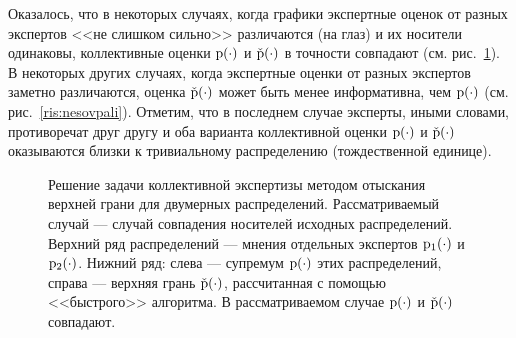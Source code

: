 Оказалось, что в некоторых случаях, когда графики экспертные оценок от разных экспертов <<не слишком сильно>> различаются (на глаз) и их носители одинаковы, коллективные оценки ${\mathrm{p}}(\cdot)$ и $\check{{\mathrm{p}}}(\cdot)$ в точности совпадают (см. рис.~\ref{ris:sovpali}). В некоторых других случаях, когда экспертные оценки от разных экспертов заметно различаются, оценка $\check{{\mathrm{p}}}(\cdot)$ может быть  менее информативна, чем ${\mathrm{p}}(\cdot)$ (см. рис.~\ref{ris:nesovpali}). Отметим, что в последнем случае эксперты, иными словами, противоречат друг другу и оба варианта коллективной оценки ${\mathrm{p}}(\cdot)$ и $\check{{\mathrm{p}}}(\cdot)$ оказываются близки к тривиальному распределению (тождественной единице).

\begin{figure}[h]
\caption{\small Решение задачи коллективной экспертизы методом отыскания верхней грани для двумерных распределений. Рассматриваемый случай --- случай совпадения носителей исходных распределений. Верхний ряд распределений --- мнения отдельных экспертов ${\mathrm{p}}_1(\cdot)$ и ${\mathrm{p}}_2(\cdot)$. Нижний ряд: слева --- супремум  ${\mathrm{p}}(\cdot)$ этих распределений, справа --- верхняя грань $\check{{\mathrm{p}}}(\cdot)$, рассчитанная с помощью <<быстрого>> алгоритма. В рассматриваемом случае ${\mathrm{p}}(\cdot)$ и $\check{{\mathrm{p}}}(\cdot)$ совпадают. }
\label{ris:sovpali}
\end{figure}

